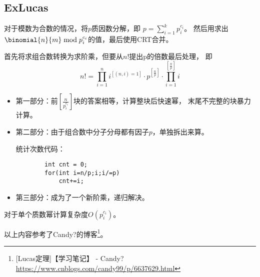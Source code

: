 \subsection{ExLucas}
对于模数为合数的情况，将$p$质因数分解，即
$\displaystyle p=\sum_{i=1}^k{p_i^{c_i}}$。
然后用求出$\binomial{n}{m} \bmod{p_i^{c_i}}$的值，最后使用CRT合并。

首先将求组合数转换为求阶乘，但要从$n!$提出p的倍数最后处理，
即\begin{displaymath}
	n!=\prod_{i=1}^n{i^{[(n,i)=1]}}\cdot p^{[\frac{n}{p}]}\cdot
	\prod_{i=1}^{[\frac{n}{p}]}i
\end{displaymath}
\begin{itemize}
	\item 第一部分：前$[\frac{n}{p_i^{c_i}}]$块的答案相等，计算整块后快速幂，
	      末尾不完整的块暴力计算。
	\item 第二部分：由于组合数中分子分母都有因子$p$，单独拆出来算。

	统计次数代码：
	\begin{lstlisting}
		int cnt = 0;
		for(int i=n/p;i;i/=p)
			cnt+=i;
	\end{lstlisting}
	\item 第三部分：成为了一个新阶乘，递归解决。
\end{itemize}
对于单个质数幂计算复杂度$O(p_i^{c_i})$。

以上内容参考了Candy?的博客\footnote{[Lucas定理]【学习笔记】 - Candy?
	\url{https://www.cnblogs.com/candy99/p/6637629.html}}。
